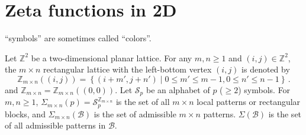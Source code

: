 
\chapter{Zeta functions in 2D}
\label{chap:zeta2D}

\renewcommand{\ssp}{\ensuremath{\phi}}             %
\renewcommand{\Ssym}[1]{{\ensuremath{m_{#1}}}}    %

``symbols'' are sometimes called ``colors''.             \toCB

Let $\mathbb{Z}^{2}$ be a two-dimensional planar lattice. For any $m,n\geq 1$ and
$(i,j)\in\mathbb{Z}^{2}$, the $m\times n$ rectangular lattice with the
left-bottom vertex $(i,j)$ is denoted by
\[
\mathbb{Z}_{m\times n}((i,j))
=\left\{(i+m',j+n')\mid 0\leq m'\leq m-1,0\leq n'\leq n-1 \right\}
\,.
\]
and
\(
\mathbb{Z}_{m\times n}=\mathbb{Z}_{m\times n}((0,0)).
\)
Let $\mathcal{S}_{p}$ be an alphabet of $p$ ($\geq 2$) symbols. For $m,n\geq 1$,
$\Sigma_{m\times n}(p)=\mathcal{S}_{p}^{\mathbb{Z}_{m\times n}}$ is the set
of all $m\times n$ local patterns or rectangular blocks, and
$\Sigma_{m\times n}(\mathcal{B})$ is the set of admissible  $m\times n$  patterns.
$\Sigma(\mathcal{B})$ is the set of all admissible patterns in
$\mathcal{B}$.



